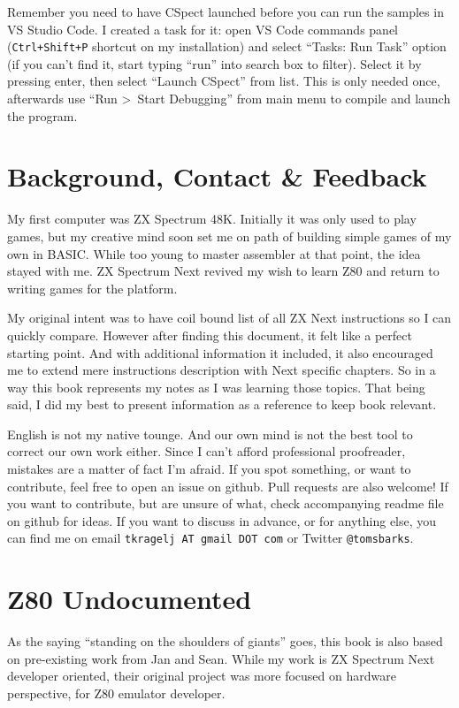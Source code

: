 \documentclass[12pt,twoside,openright,a4paper]{book}
\begin{document}
Remember you need to have CSpect launched before you can run the samples in VS Studio Code. I created a task for it: open VS Code commands panel ({\tt Ctrl+Shift+P} shortcut on my installation) and select ``Tasks: Run Task'' option (if you can't find it, start typing ``run'' into search box to filter). Select it by pressing enter, then select ``Launch CSpect'' from list. This is only needed once, afterwards use ``Run \textgreater ~Start Debugging'' from main menu to compile and launch the program.


\section{Background, Contact \& Feedback}

My first computer was ZX Spectrum 48K. Initially it was only used to play games, but my creative mind soon set me on path of building simple games of my own in BASIC. While too young to master assembler at that point, the idea stayed with me. ZX Spectrum Next revived my wish to learn Z80 and return to writing games for the platform.
	
My original intent was to have coil bound list of all ZX Next instructions so I can quickly compare. However after finding this document, it felt like a perfect starting point. And with additional information it included, it also encouraged me to extend mere instructions description with Next specific chapters. So in a way this book represents my notes as I was learning those topics. That being said, I did my best to present information as a reference to keep book relevant.

English is not my native tounge. And our own mind is not the best tool to correct our own work either. Since I can't afford professional proofreader, mistakes are a matter of fact I'm afraid. If you spot something, or want to contribute, feel free to open an issue on github. Pull requests are also welcome! If you want to contribute, but are unsure of what, check accompanying readme file on github for ideas. If you want to discuss in advance, or for anything else, you can find me on email {\tt tkragelj AT gmail DOT com} or Twitter {\tt @tomsbarks}.


\pagebreak
\section{Z80 Undocumented}

As the saying ``standing on the shoulders of giants'' goes, this book is also based on pre-existing work from Jan and Sean. While my work is ZX Spectrum Next developer oriented, their original project was more focused on hardware perspective, for Z80 emulator developer.
\end{document}
